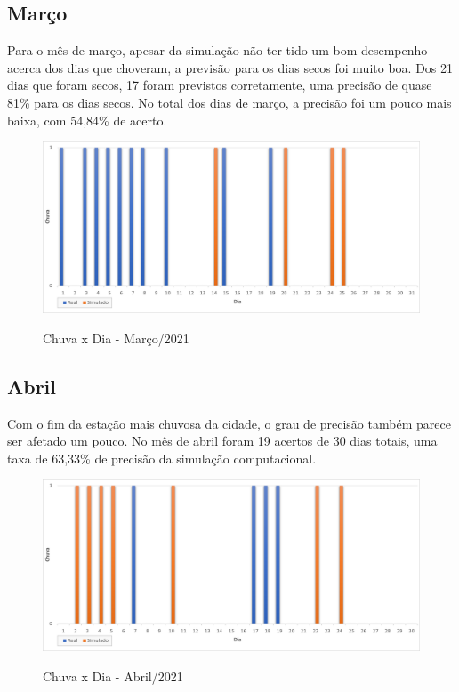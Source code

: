 \subsection{Março}
Para o mês de março, apesar da simulação não ter tido um bom desempenho acerca dos dias que choveram, a previsão para os dias secos foi muito boa. Dos 21 dias que foram secos, 17 foram previstos corretamente, uma precisão de quase 81\% para os dias secos. No total dos dias de março, a precisão foi um pouco mais baixa, com 54,84\% de acerto.
\begin{figure}[H]
	\caption{\small Chuva x Dia - Março/2021}
	\centering
	\includegraphics[width=\textwidth]{figs/mar.png}
	\label{f.rmar}
\end{figure}

\subsection{Abril}
Com o fim da estação mais chuvosa da cidade, o grau de precisão também parece ser afetado um pouco. No mês de abril foram 19 acertos de 30 dias totais, uma taxa de 63,33\% de precisão da simulação computacional.
\begin{figure}[H]
	\caption{\small Chuva x Dia - Abril/2021}
	\centering
	\includegraphics[width=\textwidth]{figs/abr.png}
	\label{f.rabr}
\end{figure}

